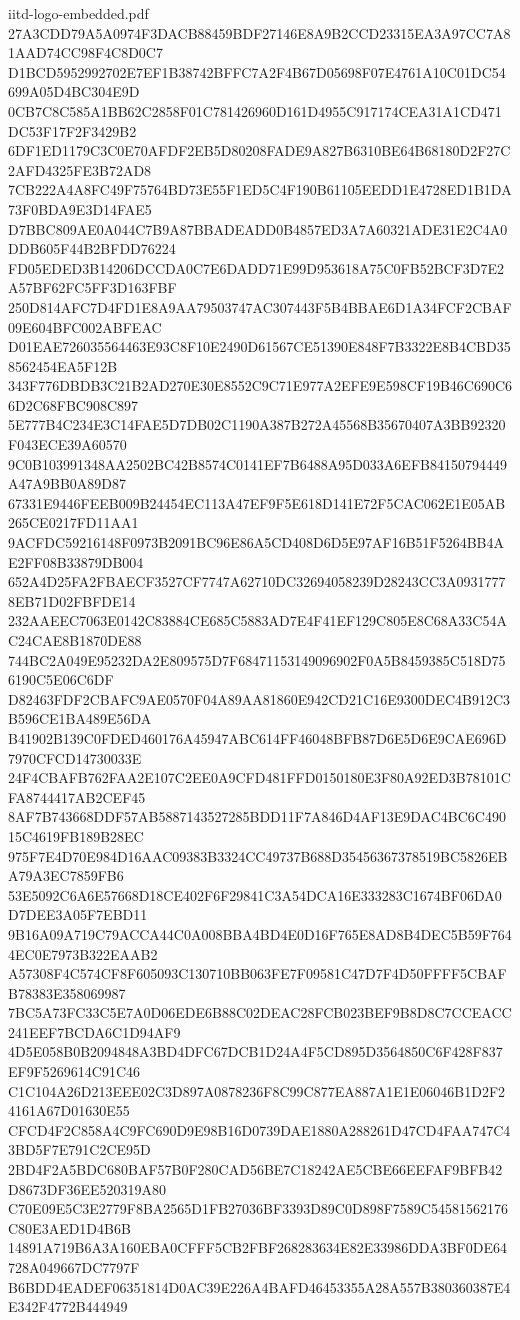 \begin{filecontents*}[overwrite]{iitd-logo-embedded.pdf}
27A3CDD79A5A0974F3DACB88459BDF27146E8A9B2CCD23315EA3A97CC7A81AAD74CC98F4C8D0C7
D1BCD5952992702E7EF1B38742BFFC7A2F4B67D05698F07E4761A10C01DC54699A05D4BC304E9D
0CB7C8C585A1BB62C2858F01C781426960D161D4955C917174CEA31A1CD471DC53F17F2F3429B2
6DF1ED1179C3C0E70AFDF2EB5D80208FADE9A827B6310BE64B68180D2F27C2AFD4325FE3B72AD8
7CB222A4A8FC49F75764BD73E55F1ED5C4F190B61105EEDD1E4728ED1B1DA73F0BDA9E3D14FAE5
D7BBC809AE0A044C7B9A87BBADEADD0B4857ED3A7A60321ADE31E2C4A0DDB605F44B2BFDD76224
FD05EDED3B14206DCCDA0C7E6DADD71E99D953618A75C0FB52BCF3D7E2A57BF62FC5FF3D163FBF
250D814AFC7D4FD1E8A9AA79503747AC307443F5B4BBAE6D1A34FCF2CBAF09E604BFC002ABFEAC
D01EAE726035564463E93C8F10E2490D61567CE51390E848F7B3322E8B4CBD358562454EA5F12B
343F776DBDB3C21B2AD270E30E8552C9C71E977A2EFE9E598CF19B46C690C66D2C68FBC908C897
5E777B4C234E3C14FAE5D7DB02C1190A387B272A45568B35670407A3BB92320F043ECE39A60570
9C0B103991348AA2502BC42B8574C0141EF7B6488A95D033A6EFB84150794449A47A9BB0A89D87
67331E9446FEEB009B24454EC113A47EF9F5E618D141E72F5CAC062E1E05AB265CE0217FD11AA1
9ACFDC59216148F0973B2091BC96E86A5CD408D6D5E97AF16B51F5264BB4AE2FF08B33879DB004
652A4D25FA2FBAECF3527CF7747A62710DC32694058239D28243CC3A09317778EB71D02FBFDE14
232AAEEC7063E0142C83884CE685C5883AD7E4F41EF129C805E8C68A33C54AC24CAE8B1870DE88
744BC2A049E95232DA2E809575D7F68471153149096902F0A5B8459385C518D756190C5E06C6DF
D82463FDF2CBAFC9AE0570F04A89AA81860E942CD21C16E9300DEC4B912C3B596CE1BA489E56DA
B41902B139C0FDED460176A45947ABC614FF46048BFB87D6E5D6E9CAE696D7970CFCD14730033E
24F4CBAFB762FAA2E107C2EE0A9CFD481FFD0150180E3F80A92ED3B78101CFA8744417AB2CEF45
8AF7B743668DDF57AB5887143527285BDD11F7A846D4AF13E9DAC4BC6C49015C4619FB189B28EC
975F7E4D70E984D16AAC09383B3324CC49737B688D35456367378519BC5826EBA79A3EC7859FB6
53E5092C6A6E57668D18CE402F6F29841C3A54DCA16E333283C1674BF06DA0D7DEE3A05F7EBD11
9B16A09A719C79ACCA44C0A008BBA4BD4E0D16F765E8AD8B4DEC5B59F7644EC0E7973B322EAAB2
A57308F4C574CF8F605093C130710BB063FE7F09581C47D7F4D50FFFF5CBAFB78383E358069987
7BC5A73FC33C5E7A0D06EDE6B88C02DEAC28FCB023BEF9B8D8C7CCEACC241EEF7BCDA6C1D94AF9
4D5E058B0B2094848A3BD4DFC67DCB1D24A4F5CD895D3564850C6F428F837EF9F5269614C91C46
C1C104A26D213EEE02C3D897A0878236F8C99C877EA887A1E1E06046B1D2F24161A67D01630E55
CFCD4F2C858A4C9FC690D9E98B16D0739DAE1880A288261D47CD4FAA747C43BD5F7E791C2CE95D
2BD4F2A5BDC680BAF57B0F280CAD56BE7C18242AE5CBE66EEFAF9BFB42D8673DF36EE520319A80
C70E09E5C3E2779F8BA2565D1FB27036BF3393D89C0D898F7589C54581562176C80E3AED1D4B6B
14891A719B6A3A160EBA0CFFF5CB2FBF268283634E82E33986DDA3BF0DE64728A049667DC7797F
B6BDD4EADEF06351814D0AC39E226A4BAFD46453355A28A557B380360387E4E342F4772B444949

\end{filecontents*}
